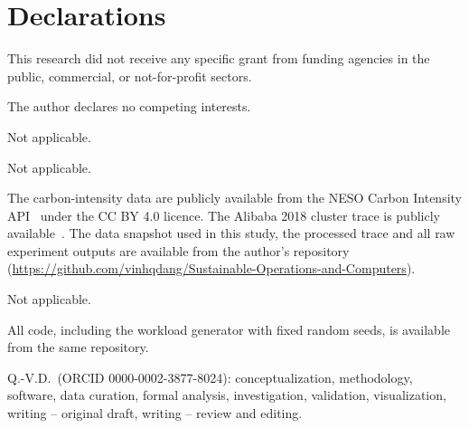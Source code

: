 \documentclass[pdflatex,sn-mathphys-num,lineno]{sn-jnl}
\theoremstyle{thmstyleone}
\begin{document}






\backmatter

\section*{Declarations}

 This research did not receive any specific grant from funding agencies in the public, commercial, or not-for-profit sectors.

 The author declares no competing interests.

 Not applicable.

 Not applicable.

 The carbon-intensity data are publicly available from the NESO Carbon Intensity API~\cite{nesoapi} under the CC BY 4.0 licence. The Alibaba 2018 cluster trace is publicly available~\cite{alibaba2018trace}. The data snapshot used in this study, the processed trace and all raw experiment outputs are available from the author's repository (\url{https://github.com/vinhqdang/Sustainable-Operations-and-Computers}).

 Not applicable.

 All code, including the workload generator with fixed random seeds, is available from the same repository.

 Q.-V.D.\ (ORCID 0000-0002-3877-8024): conceptualization, methodology, software, data curation, formal analysis, investigation, validation, visualization, writing -- original draft, writing -- review and editing.

\begin{appendices}
\setcounter{figure}{0}\setcounter{table}{0}
\makeatletter{}\makeatother
\renewcommand{\thefigure}{\Alph{section}.\arabic{figure}}
\renewcommand{\thetable}{\Alph{section}.\arabic{table}}



\end{appendices}


\end{document}
